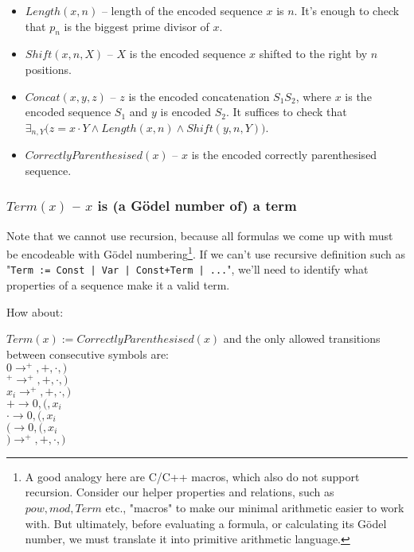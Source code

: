 \documentclass{article}
\begin{document}
\begin{itemize}
    \item $Length(x, n)$ -- length of the encoded sequence $x$ is $n$. It's enough to check that
        $p_n$ is the biggest prime divisor of $x$.
    \item $Shift(x, n, X)$ -- $X$ is the encoded sequence $x$ shifted to the right by $n$ positions.
    \item $Concat(x, y, z)$ -- $z$ is the encoded concatenation $S_1S_2$, where $x$ is the
        encoded sequence $S_1$ and $y$ is encoded $S_2$. It suffices to check that
        $\exists_{n, Y} \bigl( z = x \cdot Y \land Length(x, n) \land Shift(y, n, Y) \bigl)$.
    \item $CorrectlyParenthesised(x)$ -- $x$ is the encoded correctly parenthesised sequence.
\end{itemize}

\subsubsection{$Term(x)$ -- $x$ is (a Gödel number of) a term}

Note that we cannot use recursion, because all formulas
we come up with must be encodeable with Gödel numbering\footnote{
    A good analogy here are C/C++ macros, which also do not support recursion.
    Consider our helper properties and relations, such as $pow, mod, Term$ etc., "macros"
    to make our minimal arithmetic easier to work with. But ultimately, before evaluating
    a formula, or calculating its Gödel number, we must translate it into primitive
    arithmetic language.
}. If we can't use recursive definition such as "\texttt{Term := Const | Var | Const+Term | ...}",
we'll need to identify what properties of a sequence make it a valid term.

How about:
\begin{center}
    $Term(x) := CorrectlyParenthesised(x)$ and the only allowed transitions between consecutive
    symbols are: \\
    $0 \rightarrow ^+, +, \cdot, )$ \\
    $^+ \rightarrow ^+, +, \cdot, )$ \\
    $x_i \rightarrow ^+, +, \cdot, )$ \\
    $+ \rightarrow 0, (, x_i$ \\
    $\cdot \rightarrow 0, (, x_i$ \\
    $( \rightarrow 0, (, x_i $ \\
    $) \rightarrow ^+, +, \cdot, ) $ \\
\end{center}
\end{document}
